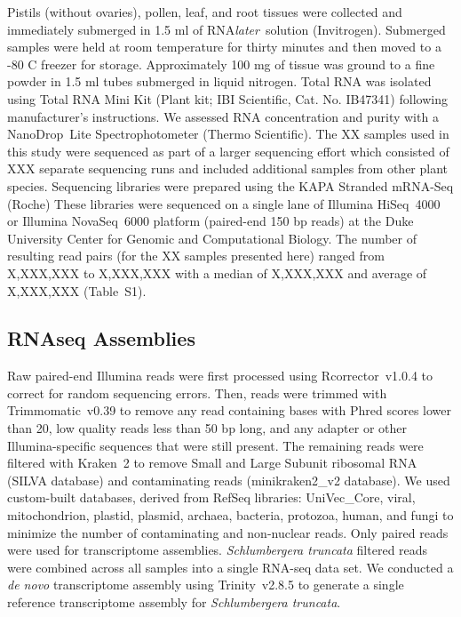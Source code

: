 \documentclass[11pt,letterpaper,titlepage]{article}
\begin{document}
\begin{linenumbers}
Pistils (without ovaries), pollen, leaf, and root tissues were collected and immediately submerged in 1.5 ml of RNA\textit{later}\texttrademark~solution (Invitrogen).
Submerged samples were held at room temperature for thirty minutes and then moved to a -80 C freezer for storage.
Approximately 100 mg of tissue was ground to a fine powder in 1.5 ml tubes submerged in liquid nitrogen.
Total RNA was isolated using Total RNA Mini Kit (Plant kit; IBI Scientific, Cat. No. IB47341) following manufacturer's instructions.
We assessed RNA concentration and purity with a NanoDrop\texttrademark~Lite Spectrophotometer (Thermo Scientific).
The XX samples used in this study were sequenced as part of a larger sequencing effort which consisted of XXX separate sequencing runs and included additional samples from other plant species.
Sequencing libraries were prepared using the KAPA Stranded mRNA-Seq (Roche)
These libraries were sequenced on a single lane of Illumina \mbox{HiSeq}~4000 or Illumina \mbox{NovaSeq}~6000 platform (paired-end 150 bp reads) at the Duke University Center for Genomic and Computational Biology.
The number of resulting read pairs (for the XX samples presented here) ranged from X,XXX,XXX to X,XXX,XXX with a median of X,XXX,XXX and average of X,XXX,XXX (Table~S1).

\subsection*{RNAseq Assemblies}

Raw paired-end Illumina reads were first processed using \mbox{Rcorrector}~v1.0.4 
 to correct for random sequencing errors.
Then, reads were trimmed with \mbox{Trimmomatic}~v0.39 
 to remove any read containing bases with Phred scores lower than 20, low quality reads less than 50 bp long, and any adapter or other Illumina-specific sequences that were still present.
The remaining reads were filtered with \mbox{Kraken}~2 
 to remove Small and Large Subunit ribosomal RNA (SILVA database) 
 and contaminating reads (minikraken2\_v2 database).
We used custom-built databases, derived from RefSeq libraries: UniVec\_Core, viral, mitochondrion, plastid, plasmid, archaea, bacteria, protozoa, human, and fungi to minimize the number of contaminating and non-nuclear reads.
Only paired reads were used for transcriptome assemblies.
\textit{Schlumbergera truncata} filtered reads were combined across all samples into a single RNA-seq data set.
We conducted a \textit{de novo} transcriptome assembly using \mbox{Trinity}~v2.8.5 
to generate a single reference transcriptome assembly for \textit{Schlumbergera truncata}.


\end{linenumbers}
\end{document}
